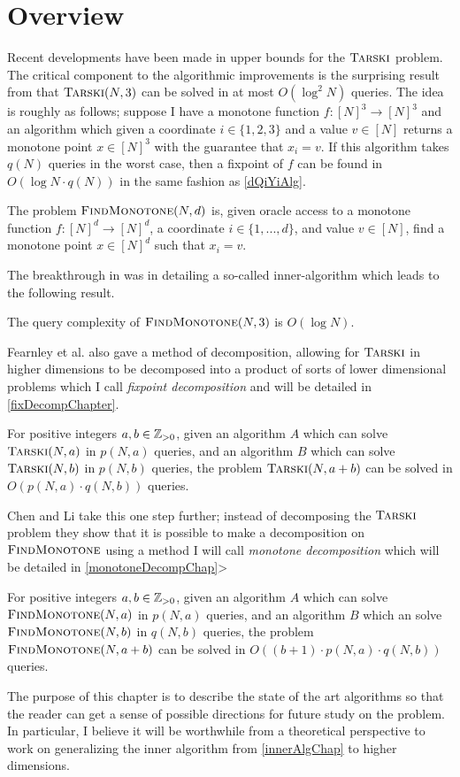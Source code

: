 \section{Overview}
Recent developments have been made in upper bounds for the $\textsc{Tarski}$ problem.
The critical component to the algorithmic improvements is
the surprising result from \citep{fasterTarski} that $\textsc{Tarski}(N, 3)$
can be solved in at most $O(\log^2 N)$ queries.
The idea is roughly as follows; suppose I have
a monotone function $f : [N]^3 \to [N]^3$ and an algorithm which
given a coordinate $i \in \{1, 2, 3\}$ and a value $v \in [N]$
returns a monotone point $x \in [N]^3$ with the guarantee
that $x_i = v$. If this algorithm takes $q(N)$ queries in the worst case,
then a fixpoint of $f$ can be found in $O(\log N \cdot q(N))$ in the
same fashion as \cref{dQiYiAlg}. 
\newcommand{\trsks}{\textsc{FindMonotone}}
\begin{definition}[\trsks]
  The problem $\trsks(N, d)$ is, given oracle access to a monotone function $f : [N]^d \to [N]^d$,
  a coordinate $i \in \{1, ..., d\}$, and value $v \in [N]$, find a monotone point $x \in [N]^d$ such that
  $x_i = v$. 
\end{definition}
The breakthrough in \citep{fasterTarski} was in detailing a so-called inner-algorithm which leads to
the following result.
\begin{theorem} \label{tightThreeDimension}
  The query complexity of $\trsks(N, 3)$ is $O(\log N)$.
\end{theorem}
Fearnley et al. also gave a method of decomposition, allowing for $\textsc{Tarski}$ in higher
dimensions to be decomposed into a product of sorts of lower
dimensional problems which I call \emph{fixpoint decomposition} and will be detailed in \cref{fixDecompChapter}. 
\begin{theorem}\label{fixDecomp}
  For positive integers $a, b \in \mathbb{Z}_{> 0}$, given an algorithm $A$
  which can solve $\textsc{Tarski}(N, a)$ in $p(N, a)$ queries, and an algorithm $B$
  which can solve $\textsc{Tarski}(N, b)$ in $p(N, b)$ queries, the problem
  $\textsc{Tarski}(N, a + b)$ can be solved in $O(p(N, a)\cdot q(N, b))$ queries.
\end{theorem}
Chen and Li take this one step further; instead of decomposing the $\textsc{Tarski}$ problem
they show that it is possible to make a decomposition on $\trsks$ using a method
I will call \emph{monotone decomposition} which will be detailed in \cref{monotoneDecompChap}>
\begin{theorem} \label{monDecomp}
  For positive integers $a, b \in \mathbb{Z}_{> 0}$, given an algorithm $A$
  which can solve $\trsks(N, a)$ in $p(N, a)$ queries, and an algorithm $B$
  which an solve $\trsks(N, b)$ in $q(N, b)$ queries, the problem $\trsks(N, a + b)$
  can be solved in $O((b + 1) \cdot p(N, a) \cdot q(N, b))$ queries.
\end{theorem}
The purpose of this chapter is to describe the state of the art algorithms
so that the reader can get a sense of possible directions for future study on the problem.
In particular, I believe it will be worthwhile from a theoretical perspective 
to work on generalizing the inner algorithm
from \cref{innerAlgChap} to higher dimensions.
